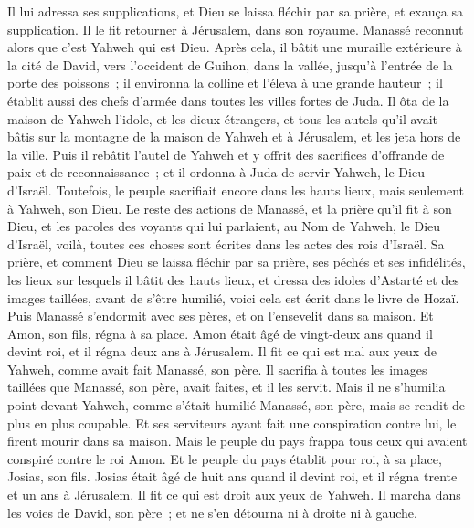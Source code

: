 \begin{multicols}{2}
Il lui adressa ses supplications, et Dieu se laissa fléchir par sa prière, et exauça sa supplication. Il le fit retourner à Jérusalem, dans son royaume. Manassé reconnut alors que c'est Yahweh qui est Dieu.
Après cela, il bâtit une muraille extérieure à la cité de David, vers l'occident de Guihon, dans la vallée, jusqu'à l'entrée de la porte des poissons~; il environna la colline et l'éleva à une grande hauteur~; il établit aussi des chefs d'armée dans toutes les villes fortes de Juda.
Il ôta de la maison de Yahweh l'idole, et les dieux étrangers, et tous les autels qu'il avait bâtis sur la montagne de la maison de Yahweh et à Jérusalem, et les jeta hors de la ville.
Puis il rebâtit l'autel de Yahweh et y offrit des sacrifices d'offrande de paix et de reconnaissance~; et il ordonna à Juda de servir Yahweh, le Dieu d'Israël.
Toutefois, le peuple sacrifiait encore dans les hauts lieux, mais seulement à Yahweh, son Dieu.
Le reste des actions de Manassé, et la prière qu'il fit à son Dieu, et les paroles des voyants qui lui parlaient, au Nom de Yahweh, le Dieu d'Israël, voilà, toutes ces choses sont écrites dans les actes des rois d'Israël.
Sa prière, et comment Dieu se laissa fléchir par sa prière, ses péchés et ses infidélités, les lieux sur lesquels il bâtit des hauts lieux, et dressa des idoles d'Astarté et des images taillées, avant de s'être humilié, voici cela est écrit dans le livre de Hozaï.
Puis Manassé s'endormit avec ses pères, et on l'ensevelit dans sa maison. Et Amon, son fils, régna à sa place.
Amon était âgé de vingt-deux ans quand il devint roi, et il régna deux ans à Jérusalem.
Il fit ce qui est mal aux yeux de Yahweh, comme avait fait Manassé, son père. Il sacrifia à toutes les images taillées que Manassé, son père, avait faites, et il les servit.
Mais il ne s'humilia point devant Yahweh, comme s'était humilié Manassé, son père, mais se rendit de plus en plus coupable.
Et ses serviteurs ayant fait une conspiration contre lui, le firent mourir dans sa maison.
Mais le peuple du pays frappa tous ceux qui avaient conspiré contre le roi Amon. Et le peuple du pays établit pour roi, à sa place, Josias, son fils.
\VerseOne{}Josias était âgé de huit ans quand il devint roi, et il régna trente et un ans à Jérusalem.
Il fit ce qui est droit aux yeux de Yahweh. Il marcha dans les voies de David, son père~; et ne s'en détourna ni à droite ni à gauche.

\end{multicols}
